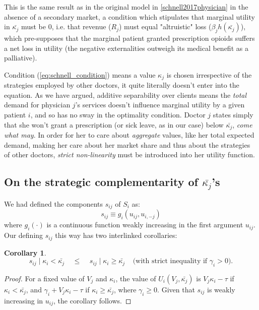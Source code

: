 \documentclass{article}
\newtheorem{corollary}[theorem]{Corollary}
\begin{document}
This is the same result as in the original model in \ref{schnell2017physician} in the absence of a secondary market, a condition which stipulates that marginal utility in $\bar{\kappa_j}$ must be $0$, i.e. that revenue ($R_j$) must equal "altruistic" loss ($\beta_j h(\bar{\kappa_j})$), which pre-supposes that the marginal patient granted prescription opioids suffers a net loss in utility (the negative externalities outweigh its medical benefit as a palliative).

Condition (\ref{eq:schnell_condition}) means a value  $\kappa_j$ is chosen irrespective of the strategies employed by other doctors, it quite literally doesn't enter into the equation. As we have argued, additive separability over clients means the \textit{total} demand for physician $j$'s services doesn't influence marginal utility by a given patient $i$, and so has no sway in the optimality condition. Doctor $j$ states simply that she won't grant a prescription (or sick leave, as in our case) below $\bar{\kappa_j}$, \textit{come what may}. In order for her to care about \textit{aggregate} values, like her total expected demand, making her care about her market share and thus about the strategies of other doctors, \textit{strict non-linearity} must be introduced into her utility function.


\subsection{On the strategic complementarity of $\bar{\kappa_j}$'s}

We had defined the components $s_{ij}$ of $S_i$  as:
\[s_{ij} \equiv g_i(u_{ij}, u_{i,-j})\]
where $g_i(\cdot)$ is a continuous function weakly increasing in the first argument $u_{ij}$. Our defining $s_{ij}$ this way has two interlinked corollaries:

\begin{corollary}
\[s_{ij} \mid \kappa_i < \bar{\kappa_j} \;\;\;\; \leq     \;\;\;\; s_{ij} \mid \kappa_i \geq \bar{\kappa_j} \;\;\;\; \text{(with strict inequality if $\gamma_i > 0$).}\]
\end{corollary}

\begin{proof}
    For a fixed value of $V_j$ and $\kappa_i$, the value of $U_i(V_j, \bar{\kappa_j})$ is $V_j \kappa_i - \tau$ if $\kappa_i < \bar{\kappa_j}$, and $\gamma_i + V_j \kappa_i - \tau$ if $\kappa_i \geq \bar{\kappa_j}$, where $\gamma_i \geq 0$. Given that $s_{ij}$ is weakly increasing in $u_{ij}$, the corollary follows.
\end{proof}
\end{document}
